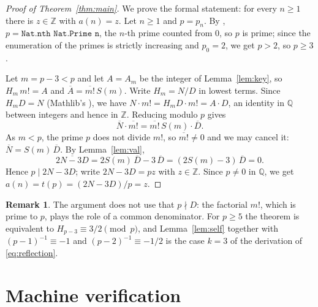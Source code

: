 \documentclass[11pt]{amsart}
\theoremstyle{plain}
\theoremstyle{definition}
\newtheorem{remark}[theorem]{Remark}
\newcommand{\Q}{\mathbb{Q}}
\newcommand{\Z}{\mathbb{Z}}
\newcommand{\res}[1]{\overline{#1}}
\begin{document}
\begin{proof}[Proof of Theorem~\ref{thm:main}]
We prove the formal statement: for every $n\ge1$ there is $z\in\Z$ with $a(n)=z$.
Let $n\ge1$ and $p=p_n$. By , $p=\texttt{Nat.nth Nat.Prime n}$, the $n$-th prime counted from $0$, so $p$ is prime; since the enumeration of the primes is strictly increasing and $p_0=2$, we get $p>2$, so $p\ge3$.

Let $m=p-3<p$ and let $A=A_m$ be the integer of Lemma~\ref{lem:key}, so $H_m\,m!=A$ and $\res A=\res{m!}\,S(m)$. Write $H_m=N/D$ in lowest terms. Since $H_m D=N$ (Mathlib's ), we have $N\cdot m!=H_m D\cdot m!=A\cdot D$, an identity in $\Q$ between integers and hence in $\Z$. Reducing modulo $p$ gives
\[
  \res N\cdot\res{m!}=\res{m!}\,S(m)\cdot\res D .
\]
As $m<p$, the prime $p$ does not divide $m!$, so $\res{m!}\ne0$ and we may cancel it: $\res N=S(m)\,\res D$. By Lemma~\ref{lem:val},
\[
  \res{2N-3D}=2S(m)\,\res D-3\,\res D=(2S(m)-3)\,\res D=0 .
\]
Hence $p\mid 2N-3D$; write $2N-3D=pz$ with $z\in\Z$. Since $p\ne0$ in $\Q$, we get $a(n)=t(p)=(2N-3D)/p=z$.
\end{proof}

\begin{remark}
The argument does not use that $p\nmid D$: the factorial $m!$, which is prime to $p$, plays the role of a common denominator. For $p\ge5$ the theorem is equivalent to $H_{p-3}\equiv3/2\pmod p$, and Lemma~\ref{lem:self} together with $(p-1)^{-1}\equiv-1$ and $(p-2)^{-1}\equiv-1/2$ is the case $k=3$ of the derivation of \eqref{eq:reflection}.
\end{remark}

\section{Machine verification}\label{sec:lean}
\end{document}
